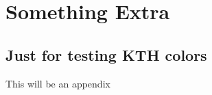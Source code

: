 \appendix
\renewcommand{\chaptermark}[1]{\markboth{Appendix \thechapter\relax:\thinspace\relax#1}{}}
\chapter{Something Extra}

\section{Just for testing KTH colors}
This will be an appendix